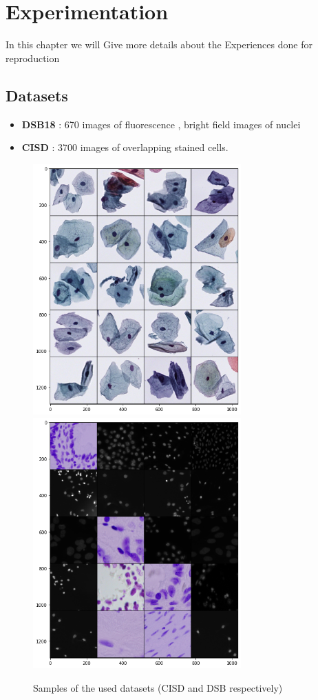 \documentclass[main.tex]{subfiles}
\begin{document}
\chapter{Experimentation}
In this chapter we will Give more details about the Experiences done for reproduction
\section{Datasets}
\begin{itemize}
    \item \textbf{DSB18} : 670 images of fluorescence , bright field images of nuclei
    \item \textbf{CISD} : 3700 images of overlapping stained cells.
\end{itemize}

\begin{figure}[H]
    \centering
    \includegraphics[width=8cm]{images/CISD.png}
    \includegraphics[width=8cm]{images/DSB18.png}
    \caption{Samples of the used datasets (CISD and DSB respectively)}
\end{figure}
\end{document}

